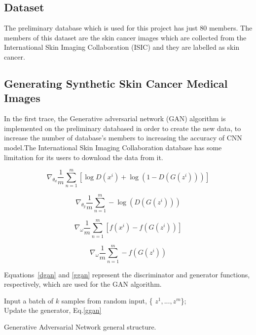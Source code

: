 \documentclass[conference]{IEEEtran}
\begin{document}
\subsection{Dataset}
The preliminary database which is used for this project has just 80 members. The members of this dataset are the skin cancer images which are collected from the International Skin Imaging Collaboration (ISIC) and they are labelled as skin cancer. 
\subsection{Generating Synthetic Skin Cancer Medical Images}
In the first trace, the Generative adversarial network (GAN) algorithm is implemented on the preliminary databased in order to create the new data, to increase the number of database's members to increasing the accuracy of CNN model.The International Skin Imaging Collaboration database has some limitation for its users to download the data from it.


\begin{equation}
\nabla_{\theta_{d}}\frac{1}{m}\sum_{n=1}^{m}[\log D(x^{i})+\log(1-D(G(z^{i})))]
\label{dgan}
\end{equation}

\begin{equation}
\nabla_{\theta_{g}}\frac{1}{m}\sum_{n=1}^{m} -\log(D(G(z^{i})))
\label{ggan}
\end{equation}



\begin{equation}
\nabla_{\omega}\frac{1}{m}\sum_{n=1}^{m}[f(x^{i})-f(G(z^{i}))]
\label{cwgan}
\end{equation}




\begin{equation}
\nabla_{\omega}\frac{1}{m}\sum_{n=1}^{m} -f(G(z^{i}))
\label{gwgan}
\end{equation}

Equations~\ref{dgan} and \ref{ggan} represent the discriminator and generator functions, respectively, which are used for the GAN algorithm. 

\begin{algorithm}[t]
 {
    Input a batch of $k$ samples from random input, \{ $z^{1}, . . . ,    z^{m}$\};\\
    Update the generator, Eq.\ref{ggan}
  }
  
 \caption{Generative Adversarial Network general structure.}
\end{algorithm}
\end{document}
